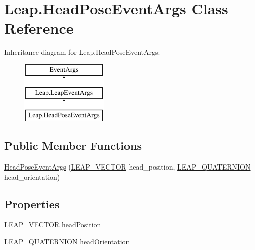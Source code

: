 \hypertarget{class_leap_1_1_head_pose_event_args}{}\section{Leap.\+Head\+Pose\+Event\+Args Class Reference}
\label{class_leap_1_1_head_pose_event_args}
Inheritance diagram for Leap.\+Head\+Pose\+Event\+Args\+:\begin{figure}[H]
\begin{center}
\leavevmode
\includegraphics[height=3.000000cm]{class_leap_1_1_head_pose_event_args}
\end{center}
\end{figure}
\subsection*{Public Member Functions}
\begin{DoxyCompactItemize}
\item 
\mbox{\hyperlink{class_leap_1_1_head_pose_event_args_a5651808cc1c843e5bab43f0d7009cb5e}{Head\+Pose\+Event\+Args}} (\mbox{\hyperlink{struct_leap_internal_1_1_l_e_a_p___v_e_c_t_o_r}{L\+E\+A\+P\+\_\+\+V\+E\+C\+T\+OR}} head\+\_\+position, \mbox{\hyperlink{struct_leap_internal_1_1_l_e_a_p___q_u_a_t_e_r_n_i_o_n}{L\+E\+A\+P\+\_\+\+Q\+U\+A\+T\+E\+R\+N\+I\+ON}} head\+\_\+orientation)
\end{DoxyCompactItemize}
\subsection*{Properties}
\begin{DoxyCompactItemize}
\item 
\mbox{\hyperlink{struct_leap_internal_1_1_l_e_a_p___v_e_c_t_o_r}{L\+E\+A\+P\+\_\+\+V\+E\+C\+T\+OR}} \mbox{\hyperlink{class_leap_1_1_head_pose_event_args_a1c084aa1bf86ab53ec7bda86847dbe3a}{head\+Position}}
\item 
\mbox{\hyperlink{struct_leap_internal_1_1_l_e_a_p___q_u_a_t_e_r_n_i_o_n}{L\+E\+A\+P\+\_\+\+Q\+U\+A\+T\+E\+R\+N\+I\+ON}} \mbox{\hyperlink{class_leap_1_1_head_pose_event_args_a754dd4e0a1065b6e06beefcfa2a9fa2c}{head\+Orientation}}
\end{DoxyCompactItemize}


